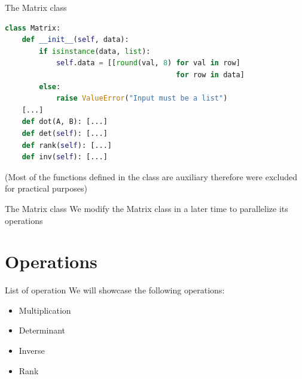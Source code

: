\documentclass{beamer}
\begin{document}
\begin{frame}[fragile]{The Matrix class}
    \begin{lstlisting}[language=Python]
class Matrix:
    def __init__(self, data):
        if isinstance(data, list):
            self.data = [[round(val, 8) for val in row]
                                        for row in data]
        else:
            raise ValueError("Input must be a list")
    [...]
    def dot(A, B): [...]
    def det(self): [...]
    def rank(self): [...]
    def inv(self): [...]
\end{lstlisting}

    (Most of the functions defined in the class are auxiliary therefore were excluded for practical purposes)
\end{frame}

\begin{frame}{The Matrix class}
    We modify the Matrix class in a later time to parallelize its operations
\end{frame}

\section{Operations}
\begin{frame}{List of operation}
    We will showcase the following operations:
    \begin{itemize}
        \item{Multiplication}
        \item{Determinant}
        \item{Inverse}
        \item{Rank}
    \end{itemize}
\end{frame}
\end{document}

